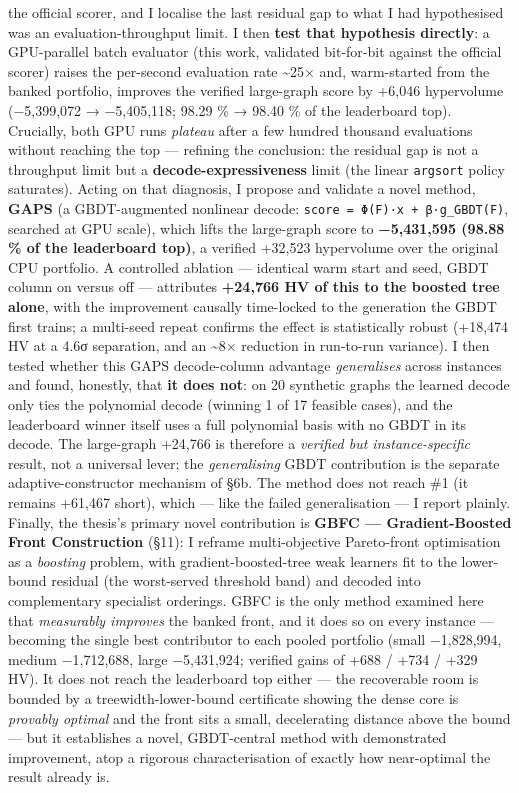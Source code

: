 \documentclass[
  11pt,
]{article}
\begin{document}
the official scorer, and I localise the last residual gap to what I had
hypothesised was an evaluation-throughput limit. I then \textbf{test
that hypothesis directly}: a GPU-parallel batch evaluator (this work,
validated bit-for-bit against the official scorer) raises the per-second
evaluation rate \textasciitilde25× and, warm-started from the banked
portfolio, improves the verified large-graph score by +6,046 hypervolume
(−5,399,072 → −5,405,118; 98.29 \% → 98.40 \% of the leaderboard top).
Crucially, both GPU runs \emph{plateau} after a few hundred thousand
evaluations without reaching the top --- refining the conclusion: the
residual gap is not a throughput limit but a
\textbf{decode-expressiveness} limit (the linear \texttt{argsort} policy
saturates). Acting on that diagnosis, I propose and validate a novel
method, \textbf{GAPS} (a GBDT-augmented nonlinear decode:
\texttt{score\ =\ Φ(F)·x\ +\ β·g\_GBDT(F)}, searched at GPU scale),
which lifts the large-graph score to \textbf{−5,431,595 (98.88 \% of the
leaderboard top)}, a verified +32,523 hypervolume over the original CPU
portfolio. A controlled ablation --- identical warm start and seed, GBDT
column on versus off --- attributes \textbf{+24,766 HV of this to the
boosted tree alone}, with the improvement causally time-locked to the
generation the GBDT first trains; a multi-seed repeat confirms the
effect is statistically robust (+18,474 HV at a 4.6σ separation, and an
\textasciitilde8× reduction in run-to-run variance). I then tested
whether this GAPS decode-column advantage \emph{generalises} across
instances and found, honestly, that \textbf{it does not}: on 20
synthetic graphs the learned decode only ties the polynomial decode
(winning 1 of 17 feasible cases), and the leaderboard winner itself uses
a full polynomial basis with no GBDT in its decode. The large-graph
+24,766 is therefore a \emph{verified but instance-specific} result, not
a universal lever; the \emph{generalising} GBDT contribution is the
separate adaptive-constructor mechanism of §6b. The method does not
reach \#1 (it remains +61,467 short), which --- like the failed
generalisation --- I report plainly. Finally, the thesis's primary novel
contribution is \textbf{GBFC --- Gradient-Boosted Front Construction}
(§11): I reframe multi-objective Pareto-front optimisation as a
\emph{boosting} problem, with gradient-boosted-tree weak learners fit to
the lower-bound residual (the worst-served threshold band) and decoded
into complementary specialist orderings. GBFC is the only method
examined here that \emph{measurably improves} the banked front, and it
does so on every instance --- becoming the single best contributor to
each pooled portfolio (small −1,828,994, medium −1,712,688, large
−5,431,924; verified gains of +688 / +734 / +329 HV). It does not reach
the leaderboard top either --- the recoverable room is bounded by a
treewidth-lower-bound certificate showing the dense core is
\emph{provably optimal} and the front sits a small, decelerating
distance above the bound --- but it establishes a novel, GBDT-central
method with demonstrated improvement, atop a rigorous characterisation
of exactly how near-optimal the result already is.
\end{document}
